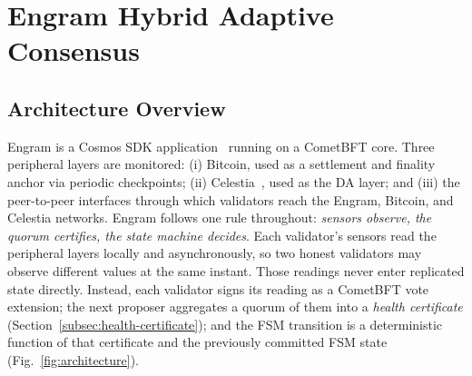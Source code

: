 \section{Engram Hybrid Adaptive Consensus}
\label{sec:design}

\subsection{Architecture Overview}
\label{subsec:architecture}

Engram is a Cosmos SDK application~\cite{kwon2016cosmos} running on a
CometBFT core. Three peripheral layers are monitored: (i) Bitcoin, used as a
settlement and finality anchor via periodic checkpoints; (ii)
Celestia~\cite{albassam2019lazyledger}, used as the DA layer; and (iii) the
peer-to-peer interfaces through which validators reach the Engram, Bitcoin,
and Celestia networks. Engram follows one rule throughout:
\emph{sensors observe, the quorum certifies, the state machine decides}.
Each validator's sensors read the peripheral layers
locally and asynchronously, so two honest validators may observe different
values at the same instant. Those readings never enter replicated state
directly. Instead, each validator signs its reading as a CometBFT vote
extension; the next proposer aggregates a quorum of them into a
\emph{health certificate} (Section~\ref{subsec:health-certificate}); and the
FSM transition is a deterministic function of that certificate and the
previously committed FSM state (Fig.~\ref{fig:architecture}).

